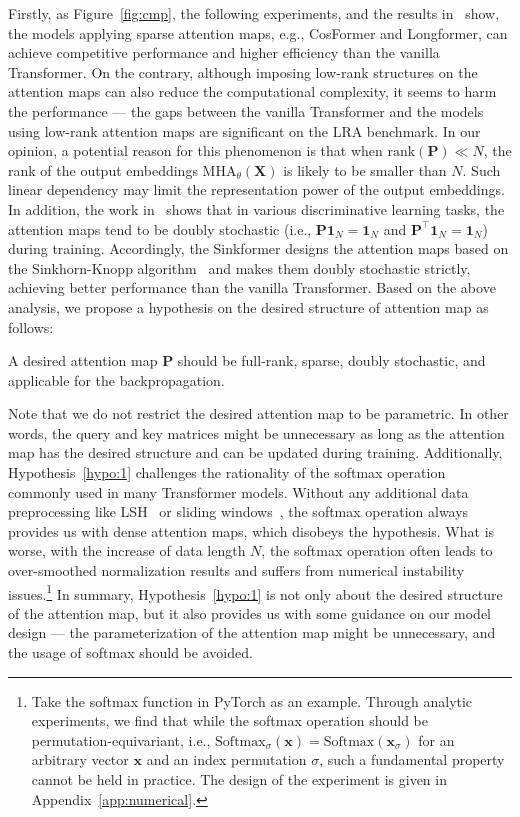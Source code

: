 Firstly, as Figure~\ref{fig:cmp}, the following experiments, and the results in~\cite{beltagy2020longformer,gu2021efficiently,zhen2022cosformer,ma2022mega} show, the models applying sparse attention maps, e.g., CosFormer and Longformer, can achieve competitive performance and higher efficiency than the vanilla Transformer. 
On the contrary, although imposing low-rank structures on the attention maps can also reduce the computational complexity, it seems to harm the performance --- the gaps between the vanilla Transformer and the models using low-rank attention maps are significant on the LRA benchmark. 
In our opinion, a potential reason for this phenomenon is that when $\text{rank}(\bm{P})\ll N$, the rank of the output embeddings $\text{MHA}_{\theta}(\bm{X})$ is likely to be smaller than $N$. 
Such linear dependency may limit the representation power of the output embeddings.
In addition, the work in~\cite{sander2022sinkformers} shows that in various discriminative learning tasks, the attention maps tend to be doubly stochastic (i.e., $\bm{P}\bm{1}_N=\bm{1}_N$ and $\bm{P}^{\top}\bm{1}_N=\bm{1}_N$) during training. 
Accordingly, the Sinkformer designs the attention maps based on the Sinkhorn-Knopp algorithm~\cite{sinkhorn1967concerning} and makes them doubly stochastic strictly, achieving better performance than the vanilla Transformer. 
Based on the above analysis, we propose a hypothesis on the desired structure of attention map as follows:
\begin{hypothesis}\label{hypo:1}
A desired attention map $\bm{P}$ should be full-rank, sparse, doubly stochastic, and applicable for the backpropagation.
\end{hypothesis}
Note that we do not restrict the desired attention map to be parametric. 
In other words, the query and key matrices might be unnecessary as long as the attention map has the desired structure and can be updated during training. 
Additionally, Hypothesis~\ref{hypo:1} challenges the rationality of the softmax operation commonly used in many Transformer models. 
Without any additional data preprocessing like LSH~\cite{kitaev2020reformer} or sliding windows~\cite{beltagy2020longformer,child2019generating}, the softmax operation always provides us with dense attention maps, which disobeys the hypothesis. 
What is worse, with the increase of data length $N$, the softmax operation often leads to over-smoothed normalization results and suffers from numerical instability issues.\footnote{Take the softmax function in PyTorch as an example. 
Through analytic experiments, we find that while the softmax operation should be permutation-equivariant, i.e., $\text{Softmax}_{\sigma}(\bm{x})=\text{Softmax}(\bm{x}_{\sigma})$ for an arbitrary vector $\bm{x}$ and an index permutation $\sigma$, such a fundamental property cannot be held in practice. 
The design of the experiment is given in Appendix~\ref{app:numerical}.}
In summary, Hypothesis~\ref{hypo:1} is not only about the desired structure of the attention map, but it also provides us with some guidance on our model design --- the parameterization of the attention map might be unnecessary, and the usage of softmax should be avoided. 

